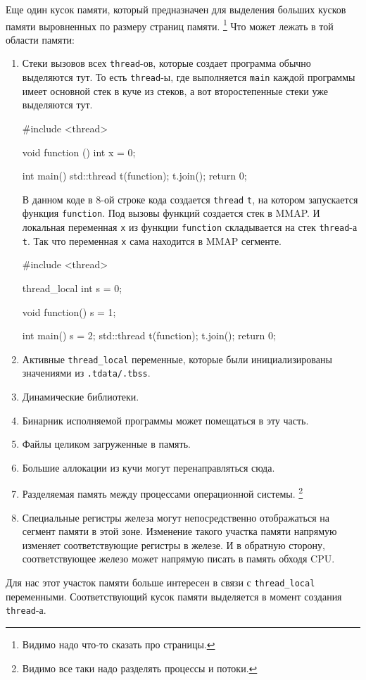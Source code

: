 \documentclass{article}
\begin{document}
Еще один кусок памяти, который предназначен для выделения больших кусков памяти выровненных по размеру страниц памяти.%
\footnote{Видимо надо что-то сказать про страницы.}
Что может лежать в той области памяти:
\begin{enumerate}
\item Стеки вызовов всех \verb"thread"-ов, которые создает программа обычно выделяются тут.
То есть \verb"thread"-ы, где выполняется \verb"main" каждой программы имеет основной стек в куче из стеков, а вот второстепенные стеки уже выделяются тут.
\begin{cppcode}
#include <thread>

void function () {
  int x = 0;
}

int main() {
  std::thread t(function);
  t.join();
  return 0;
}
\end{cppcode}
В данном коде в $8$-ой строке кода создается \verb"thread" \verb"t", на котором запускается функция \verb"function".
Под вызовы функций создается стек в MMAP.
И локальная переменная \verb"x" из функции \verb"function" складывается на стек \verb"thread"-а \verb"t".
Так что переменная \verb"x" сама находится в MMAP сегменте.
\begin{cppcode}
#include <thread>

thread_local int s = 0;

void function() {
  s = 1;
}

int main() {
  s = 2;
  std::thread t(function);
  t.join();
  return 0;
}
\end{cppcode}


\item Активные \verb"thread_local" переменные, которые были инициализированы значениями из \verb".tdata/.tbss".

\item Динамические библиотеки.

\item Бинарник исполняемой программы может помещаться в эту часть.

\item Файлы целиком загруженные в память.

\item Большие аллокации из кучи могут перенаправляться сюда.

\item Разделяемая память между процессами операционной системы.%
\footnote{Видимо все таки надо разделять процессы и потоки.}

\item Специальные регистры железа могут непосредственно отображаться на сегмент памяти в этой зоне.
Изменение такого участка памяти напрямую изменяет соответствующие регистры в железе.
И в обратную сторону, соответствующее железо может напрямую писать в память обходя CPU.
\end{enumerate}
Для нас этот участок памяти больше интересен в связи с \verb"thread_local" переменными.
Соответствующий кусок памяти выделяется в момент создания \verb"thread"-а.
\end{document}
